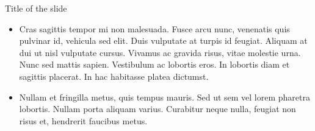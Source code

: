 \documentclass[russian,12pt,aspectratio=169,xcolor=table]{beamer}
\begin{document}
\makethanks

\begin{frame}
\end{frame}

\appendix

\begin{frame}{Title of the slide}
  \begin{itemize}
    \item Cras sagittis tempor mi non malesuada. Fusce arcu nunc, venenatis quis pulvinar id, vehicula sed elit. Duis vulputate at turpis id feugiat. Aliquam at dui ut nisl vulputate cursus. Vivamus ac gravida risus, vitae molestie urna. Nunc sed mattis sapien. Vestibulum ac lobortis eros. In lobortis diam et sagittis placerat. In hac habitasse platea dictumst.
    \item Nullam et fringilla metus, quis tempus mauris. Sed ut sem vel lorem pharetra lobortis. Nullam porta aliquam varius. Curabitur neque nulla, feugiat non risus et, hendrerit faucibus metus. 
  \end{itemize}
\end{frame}
\end{document}
